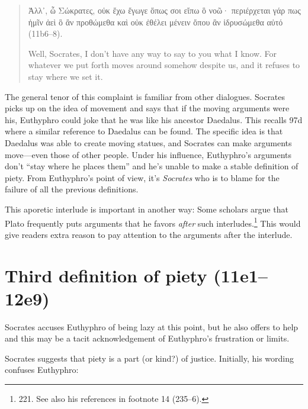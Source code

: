 \documentclass[11pt]{article}
\begin{document}
\begin{quote}

    {\g
    Ἀλλ᾽, ὦ Σώκρατες, οὐκ ἔχω ἔγωγε ὅπως σοι εἴπω ὃ νοῶ· περιέρχεται γάρ
    πως ἡμῖν ἀεὶ ὃ ἂν προθώμεθα καὶ οὐκ ἐθέλει μένειν ὅπου ἂν ἱδρυσώμεθα
    αὐτό
    } (11b6--8).

    Well, Socrates, I don't have any way to say to you what I know.  For
    whatever we put forth moves around somehow despite us, and it refuses
    to stay where we set it.

\end{quote}

The general tenor of this complaint is familiar from other dialogues.
Socrates picks up on the idea of movement and says that if the moving
arguments were his, Euthyphro could joke that he was like his ancestor
Daedalus.  This recalls  97d where a similar reference to
Daedalus can be found.  The specific idea is that Daedalus was able to
create moving statues, and Socrates can make arguments move---even those
of other people.  Under his influence, Euthyphro's arguments don't ``stay
where he places them'' and he's unable to make a stable definition of piety.
From Euthyphro's point of view, it's \emph{Socrates} who is to blame for
the failure of all the previous definitions.

This aporetic interlude is important in another way: Some scholars argue
that Plato frequently puts arguments that he favors \emph{after} such
interludes.\footnote{\citet{mcpherran1992} 221.  See also his references in
footnote 14 (235--6).}  This would give readers extra reason to pay
attention to the arguments after the interlude.


\section{Third definition of piety (11e1--12e9)}

Socrates accuses Euthyphro of being lazy at this point, but he also offers
to help and this may be a tacit acknowledgement of Euthyphro's frustration
or limits.

Socrates suggests that piety is a part (or kind?) of justice.  Initially,
his wording confuses Euthyphro:
\end{document}

